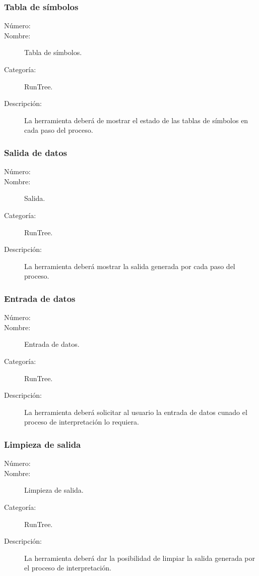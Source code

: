 \subsubsection{Tabla de símbolos}
\begin{framed}
	\begin{description}
		\item [Número:] \cn
		\item [Nombre:] Tabla de símbolos.
		\item [Categoría:] RunTree.
		\item [Descripción:] La herramienta deberá de mostrar el estado de las tablas de símbolos en cada paso del proceso.
	\end {description}
\end{framed}

\subsubsection{Salida de datos}
\begin{framed}
	\begin{description}
		\item [Número:] \cn
		\item [Nombre:] Salida.
		\item [Categoría:] RunTree.
		\item [Descripción:] La herramienta deberá mostrar la salida generada por cada paso del proceso.
	\end {description}
\end{framed}

\subsubsection{Entrada de datos}
\begin{framed}
	\begin{description}
		\item [Número:] \cn
		\item [Nombre:] Entrada de datos.
		\item [Categoría:] RunTree.
		\item [Descripción:] La herramienta deberá solicitar al usuario la entrada de datos cunado el proceso de interpretación lo requiera.
	\end {description}
\end{framed}

\subsubsection{Limpieza de salida}
\begin{framed}
	\begin{description}
		\item [Número:] \cn
		\item [Nombre:] Limpieza de salida.
		\item [Categoría:] RunTree.
		\item [Descripción:] La herramienta deberá dar la posibilidad de limpiar la salida generada por el proceso de interpretación.
	\end {description}
\end{framed}

